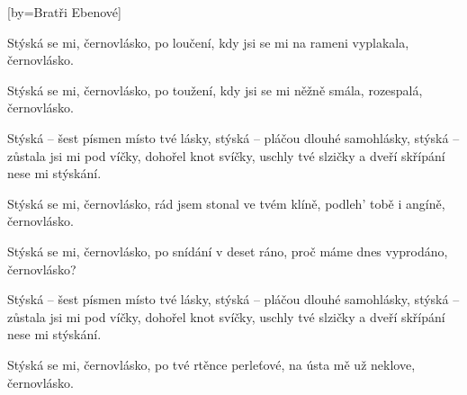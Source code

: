 [by={Bratři Ebenové}]

\beginverse{}
Stýská se mi, černovlásko,
po loučení, kdy jsi se mi
na rameni vyplakala, černovlásko.  
\endverse{}

\beginverse{}
Stýská se mi, černovlásko,
po toužení, kdy jsi se mi
něžně smála, rozespalá, černovlásko.  
\endverse{}

\beginchorus{}
Stýská -- šest písmen místo tvé lásky,
stýská -- pláčou dlouhé samohlásky,
stýská -- zůstala jsi mi pod víčky,
dohořel knot svíčky, uschly tvé slzičky
a dveří skřípání nese mi stýskání.
\endchorus{}

\beginverse{}
Stýská se mi, černovlásko,
rád jsem stonal ve tvém klíně,
podleh' tobě i angíně, černovlásko.  
\endverse{}

\beginverse{}
Stýská se mi, černovlásko,
po snídání v deset ráno,
proč máme dnes vyprodáno, černovlásko?  
\endverse{}

\beginchorus{}
Stýská -- šest písmen místo tvé lásky,
stýská -- pláčou dlouhé samohlásky,
stýská -- zůstala jsi mi pod víčky,
dohořel knot svíčky, uschly tvé slzičky
a dveří skřípání nese mi stýskání.
\endchorus{}

\beginverse{}
Stýská se mi, černovlásko,
po tvé rtěnce perleťové,
na ústa mě už neklove, černovlásko.  
\endverse{}

